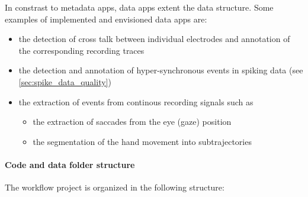In constrast to metadata apps, data apps extent the  data structure. Some examples of implemented and envisioned data apps are:
\begin{itemize}
  \setlength{\itemsep}{0pt}
  \setlength{\parskip}{0pt}
  \setlength{\parsep}{0pt}
 \item the detection of cross talk between individual electrodes and annotation of the corresponding recording traces
  \item the detection and annotation of hyper-synchronous events in spiking data (see \cref{sec:spike_data_quality})
 \item the extraction of events from continous recording signals such as
 \begin{itemize}
  \setlength\itemsep{0pt}
  \setlength{\parskip}{0pt}
  \setlength{\parsep}{0pt}
  \item the extraction of saccades from the eye (gaze) position
  \item the segmentation of the hand movement into subtrajectories
 \end{itemize}
\end{itemize}


\paragraph{Code and data folder structure}
The workflow project is organized in the following structure:\\

\renewcommand*\DTstylecomment{\color{gray}\textit}
\renewcommand*\DTstyle{\textcolor{black!90}}
\begin{minipage}[t]{\textwidth}
\ \\
\end{minipage}


